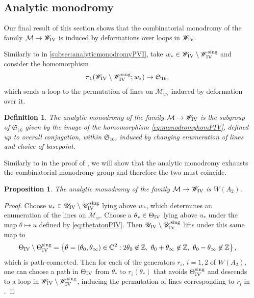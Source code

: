 \documentclass[a4paper,reqno]{amsart}
\numberwithin{equation}{section}
\newcommand{\Z}{\mathbb{Z}}
\newcommand{\C}{\mathbb{C}}
\newtheorem{definition}[theorem]{Definition}
\newtheorem{proposition}[theorem]{Proposition}
\numberwithin{equation}{section}
\begin{document}
\subsection{Analytic monodromy}
Our final result of this section shows that the combinatorial monodromy of the family $\mathcal{M}\to\mathscr{W}_{\rm{IV}}$ is induced by deformations over loops in $\mathscr{W}_{\rm{IV}}$.

Similarly to in \cref{subsec:analyticmonodromyPVI}, take $w_* \in \mathscr{W}_{\rm{IV}}\setminus \mathscr{W}_{\rm{IV}}^{\operatorname{sing}}$ and consider the homomorphism
\begin{equation} \label{eq:monodromyhomPIV}
    \pi_1(\mathscr{W}_{\rm{IV}}\setminus \mathscr{W}_{\rm{IV}}^{\operatorname{sing}} ; w_*) \to \mathfrak{S}_{16},
\end{equation}
which sends a loop to the permutation of lines on $\overline{\mathcal{M}}_{w_*}$ induced by deformation over it.

\begin{definition}
    The \emph{analytic monodromy} of the family $\mathcal{M}\to\mathscr{W}_{\rm{IV}}$ is the subgroup of $\mathfrak{S}_{16}$ given by the image of the homomorphism \eqref{eq:monodromyhomPIV}, defined up to overall conjugation, within $\mathfrak{S}_{16}$, induced by changing enumeration of lines and choice of basepoint.
\end{definition}

Similarly to in the proof of , we will show that the analytic monodromy exhausts the combinatorial monodromy group and therefore the two must coincide.

\begin{proposition} \label{prop:analyticmonodromyPIV}
    The analytic monodromy of the family $\mathcal{M}\to\mathscr{W}_{\rm{IV}}$ is $W(A_2)$.
\end{proposition}
\begin{proof}
    Choose $u_*\in\mathscr{U}_{\rm{IV}}\setminus \mathscr{U}_{\rm{IV}}^{\operatorname{sing}}$ lying above $w_*$, which determines an enumeration of the lines on $\overline{\mathcal{M}}_w$. Choose a $\theta_*\in\Theta_{\rm{IV}}$ lying above $u_*$ under the map $\theta\mapsto u$ defined by \cref{eq:thetatouPIV}. 
    Then $\mathscr{U}_{\rm{IV}}\setminus\mathscr{U}_{\rm{IV}}^{\operatorname{sing}}$ lifts under this same map to
    $$\Theta_{\rm{IV}}\setminus \Theta_{\rm{IV}}^{\operatorname{sing}} = \left\{ \theta = (\theta_0,\theta_{\infty})\in \C^2 : 2\theta_0\not\in  \Z, \,\,\theta_0+\theta_{\infty}\not\in \Z, \,\,\theta_0-\theta_{\infty}\not\in \Z \right\},$$
    which is path-connected.
    Then for each of the generators $r_i$, $i=1,2$ of $W(A_2)$, one can choose a path in $\Theta_{\rm{IV}}$ from $\theta_*$ to $r_i(\theta_*)$ that avoids $\Theta_{\rm{IV}}^{\operatorname{sing}}$ and descends to a loop in $\mathscr{W}_{\rm{IV}}\setminus \mathscr{W}_{\rm{IV}}^{\operatorname{sing}}$, inducing the permutation of lines corresponding to $r_i$ in .
\end{proof}
\end{document}
